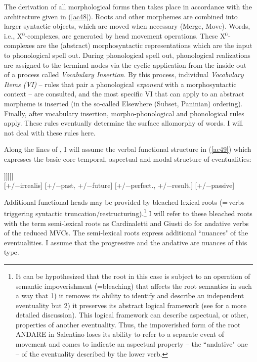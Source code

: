 \documentclass[output=paper]{langscibook}
\begin{document}
The derivation of all morphological forms then takes place in accordance with the architecture given in (\ref{ac48}). Roots and other morphemes are combined into larger syntactic objects, which are moved when necessary (Merge, Move). Words, i.e., X$^0$-complexes, are generated by head movement operations. These X$^0$-complexes are the (abstract) morphosyntactic representations which are the input to phonological spell out.  During phonological spell out, phonological realizations are assigned to the terminal nodes via the cyclic application from the inside out of a process called \textit{Vocabulary Insertion}. By this process, individual \textit{Vocabulary Items (VI)}  --  rules that pair a phonological \textit{exponent} with a morphosyntactic context -- are consulted, and the most specific VI that can apply to an abstract morpheme is inserted (in the so-called Elsewhere (Subset, Paninian) ordering).  Finally, after vocabulary insertion, morpho-phonological and phonological rules apply.  These rules eventually determine the surface allomorphy of words.  I will not deal with these rules here.

Along the lines of \citet{wurmbrand2015}, I will assume the verbal functional structure in (\ref{ac49}) which expresses the basic core temporal, aspectual and modal structure of eventualities:

\ea \label{ac49}
\gll [\textsubscript{MoodP} Mood$^0$ [\textsubscript{TenseP} T$^0$ [\textsubscript{AspP} Asp$^0$ [\textsubscript{VoiceP} Voice$^0$ [\textsubscript{vP} v$^0$ [\textsubscript{√p} √Root$^0$ ]]]]]]\\
     {} [+/−irrealis] {} {[+/−past, +/−future]} {}  {[+/−perfect., +/−result.]} {} [+/−passive] {} {} {} {} {}\\
\z

Additional functional heads may be provided by bleached lexical roots (=\,verbs triggering syntactic truncation\slash restructuring).\footnote{It can be hypothesized that the root in this case is subject to an operation of semantic impoverishment (=bleaching) that affects the root semantics in such a way that 1) it removes its ability to identify and describe an independent eventuality but 2) it preserves its abstract logical framework (see \citealt{roberts2010a} for a more detailed discussion).  This logical framework can describe aspectual, or other, properties of another eventuality.  Thus, the impoverished form of the root ANDARE in Salentino loses its ability to refer to a separate event of movement and comes to indicate an aspectual property -- the “andative" one -- of the eventuality described by the lower verb.}  I will refer to these bleached roots with the term semi-lexical roots as Cardinaletti and Giusti do for andative verbs of the reduced MVCs. The semi-lexical roots express additional ``nuances" of the eventualities.   I assume that the progressive and the andative are nuances of this type.
\end{document}
